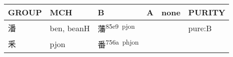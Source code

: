 \documentclass[14pt,a4paper]{scrartcl}
\begin{document}
\begin{longtable}[c]{@{}llllll@{}}
\toprule
\begin{minipage}[b]{0.14\columnwidth}\raggedright\strut
GROUP
\strut\end{minipage} &
\begin{minipage}[b]{0.14\columnwidth}\raggedright\strut
MCH
\strut\end{minipage} &
\begin{minipage}[b]{0.14\columnwidth}\raggedright\strut
B
\strut\end{minipage} &
\begin{minipage}[b]{0.14\columnwidth}\raggedright\strut
A
\strut\end{minipage} &
\begin{minipage}[b]{0.14\columnwidth}\raggedright\strut
none
\strut\end{minipage} &
\begin{minipage}[b]{0.14\columnwidth}\raggedright\strut
PURITY
\strut\end{minipage}\tabularnewline
\midrule
\endhead
\begin{minipage}[t]{0.14\columnwidth}\raggedright\strut
潘
\strut\end{minipage} &
\begin{minipage}[t]{0.14\columnwidth}\raggedright\strut
ben, beanH
\strut\end{minipage} &
\begin{minipage}[t]{0.14\columnwidth}\raggedright\strut
藩\textsuperscript{85e9~pjon}
\strut\end{minipage} &
\begin{minipage}[t]{0.14\columnwidth}\raggedright\strut
\strut\end{minipage} &
\begin{minipage}[t]{0.14\columnwidth}\raggedright\strut
\strut\end{minipage} &
\begin{minipage}[t]{0.14\columnwidth}\raggedright\strut
pure:B
\strut\end{minipage}\tabularnewline
\begin{minipage}[t]{0.14\columnwidth}\raggedright\strut
釆
\strut\end{minipage} &
\begin{minipage}[t]{0.14\columnwidth}\raggedright\strut
pjon
\strut\end{minipage} &
\begin{minipage}[t]{0.14\columnwidth}\raggedright\strut
番\textsuperscript{756a~phjon}
\strut\end{minipage} &

\end{longtable}
\end{document}
